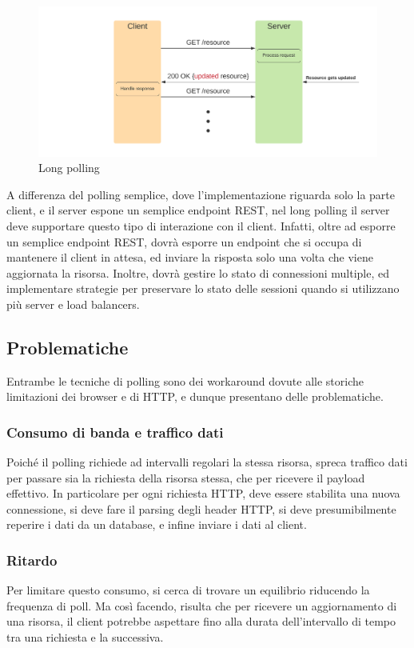 \documentclass[12pt,a4paper,openright]{report}
\begin{document}
\begin{description}
\begin{figure}[htbp]
\centering
\includegraphics[width=.8\textwidth]{assets/long_polling.png}
\caption{Long polling}
\end{figure}

A differenza del polling semplice, dove l’implementazione riguarda solo la parte client, e il server espone un semplice endpoint REST, nel long polling il server deve supportare questo tipo di interazione con il client. Infatti, oltre ad esporre un semplice endpoint REST, dovrà esporre un endpoint che si occupa di mantenere il client in attesa, ed inviare la risposta solo una volta che viene aggiornata la risorsa. Inoltre, dovrà gestire lo stato di connessioni multiple, ed implementare strategie per preservare lo stato delle sessioni quando si utilizzano più server e load balancers.

\end{description}

\subsection{Problematiche}
Entrambe le tecniche di polling sono dei workaround dovute alle storiche limitazioni dei browser e di HTTP, e dunque presentano delle problematiche. 
\subsubsection{Consumo di banda e traffico dati}
Poiché il polling richiede ad intervalli regolari la stessa risorsa, spreca traffico dati per passare sia la richiesta della risorsa stessa, che per ricevere il payload effettivo. In particolare per ogni richiesta HTTP, deve essere stabilita una nuova connessione, si deve fare il parsing degli header HTTP, si deve presumibilmente reperire i dati da un database, e infine inviare i dati al client.

\subsubsection{Ritardo}
Per limitare questo consumo, si cerca di trovare un equilibrio riducendo la frequenza di poll. Ma così facendo, risulta che per ricevere un aggiornamento di una risorsa, il client potrebbe aspettare fino alla durata dell’intervallo di tempo tra una richiesta e la successiva.
\end{document}
